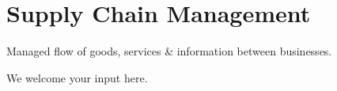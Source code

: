 \section{Supply Chain Management}\label{sec:ekgmm-a-3-3}

Managed flow of goods, services \& information between businesses.

\ekgmmContextSection

We welcome your input here.

